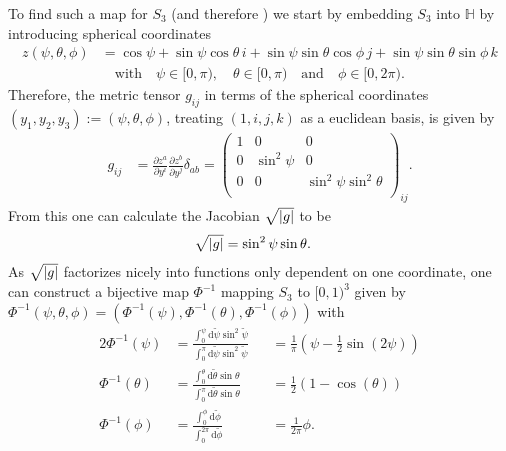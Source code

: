 To find such a map for $S_3$ (and therefore \SUTwo) we start by embedding $S_3$ into $\mathbb{H}$ by introducing spherical coordinates
\begin{align*}
 z (\psi, \theta, \phi) & =
 \cos \psi + \sin \psi \cos \theta \, i + \sin \psi \sin \theta \cos \phi \, j + \sin \psi \sin \theta \sin \phi \, k                                \\
                        & \quad \textrm{with} \quad \psi \in [0,\pi), \quad \theta \in [0,\pi) \quad \textrm{and} \quad \phi \in [0,2\pi) \textrm{.}
\end{align*}
Therefore, the metric tensor $g_{ij}$ in terms of the spherical coordinates $(y_1, y_2, y_3) := (\psi, \theta, \phi)$, treating $(1,i,j,k)$ as a euclidean basis, is given by
\begin{align*}
 g_{ij} & = \frac{\partial z^a}{\partial y^i} \frac{\partial z^b}{\partial y^j} \delta_{ab} = \begin{pmatrix}
  1 & 0           & 0                         \\
  0 & \sin^2 \psi & 0                         \\
  0 & 0           & \sin^2 \psi \sin^2 \theta \\
 \end{pmatrix}_{ij} \textrm{.}
\end{align*}
From this one can calculate the Jacobian $\sqrt{\abs{g}}$ to be
\begin{align*}
 \sqrt{\abs{g}} & = \sin^2 \psi \sin \theta \textrm{.}
\end{align*}
As $\sqrt{\abs{g}}$ factorizes nicely into functions only dependent on one coordinate, one can construct a bijective map $\Phi^{-1}$ mapping $S_3$ to $[0,1)^3$ given by $\Phi^{-1}(\psi,\theta,\phi) = \left(\Phi^{-1} (\psi), \Phi^{-1}(\theta), \Phi^{-1} (\phi) \right)$ with
\begin{alignat*}{2}
 \Phi^{-1} (\psi)   & = \frac{\int_0^{\psi}\textrm{d}\tilde{\psi} \sin^2 \tilde{\psi}}{\int_0^\pi \textrm{d} \tilde{\psi} \sin^2 \tilde{\psi}} &  & = \frac{1}{\pi}  \left( \psi - \frac{1}{2} \sin( 2 \psi) \right) \\
 \Phi^{-1} (\theta) & = \frac{\int_0^{\theta}\textrm{d}\tilde{\theta} \sin \theta}{\int_0^\pi \textrm{d}\tilde{\theta} \sin \theta}            &  & = \frac{1}{2} \left( 1-\cos(\theta) \right)                      \\
 \Phi^{-1} (\phi)   & = \frac{\int_0^{\phi}\textrm{d}\tilde{\phi} }{\int_0^{2 \pi} \textrm{d} \tilde{\phi}}                                    &  & = \frac{1}{2 \pi} \phi \textrm{.}
\end{alignat*}
